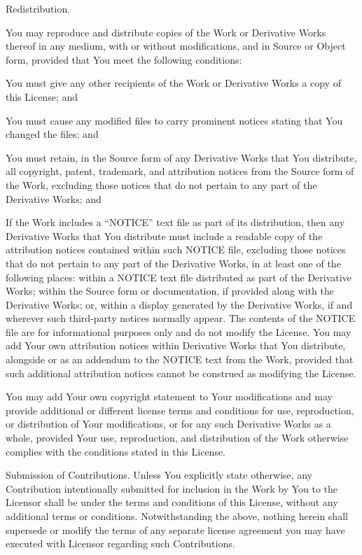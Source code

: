 \documentclass{article}
\begin{document}
  Redistribution. 

  You may reproduce and distribute copies of the Work
  or Derivative Works thereof in any medium, with or without
  modifications, and in Source or Object form, provided that You meet
  the following conditions:

    You must give any other recipients of the Work or Derivative Works
    a copy of this License; and

    You must cause any modified files to carry prominent notices
    stating that You changed the files; and

    You must retain, in the Source form of any Derivative Works that
    You distribute, all copyright, patent, trademark, and attribution
    notices from the Source form of the Work, excluding those notices
    that do not pertain to any part of the Derivative Works; and

    If the Work includes a ``NOTICE'' text file as part of its
    distribution, then any Derivative Works that You distribute must
    include a readable copy of the attribution notices contained within
    such NOTICE file, excluding those notices that do not pertain to
    any part of the Derivative Works, in at least one of the following
    places: within a NOTICE text file distributed as part of the
    Derivative Works; within the Source form or documentation, if
    provided along with the Derivative Works; or, within a display
    generated by the Derivative Works, if and wherever such third-party
    notices normally appear. The contents of the NOTICE file are for
    informational purposes only and do not modify the License. You may
    add Your own attribution notices within Derivative Works that You
    distribute, alongside or as an addendum to the NOTICE text from the
    Work, provided that such additional attribution notices cannot be
    construed as modifying the License.

  You may add Your own copyright statement to Your modifications and
  may provide additional or different license terms and conditions
  for use, reproduction, or distribution of Your modifications, or
  for any such Derivative Works as a whole, provided Your use,
  reproduction, and distribution of the Work otherwise complies with
  the conditions stated in this License.

  Submission of Contributions. Unless You explicitly state otherwise,
  any Contribution intentionally submitted for inclusion in the Work
  by You to the Licensor shall be under the terms and conditions of
  this License, without any additional terms or conditions.
  Notwithstanding the above, nothing herein shall supersede or modify
  the terms of any separate license agreement you may have executed
  with Licensor regarding such Contributions.
\end{document}
